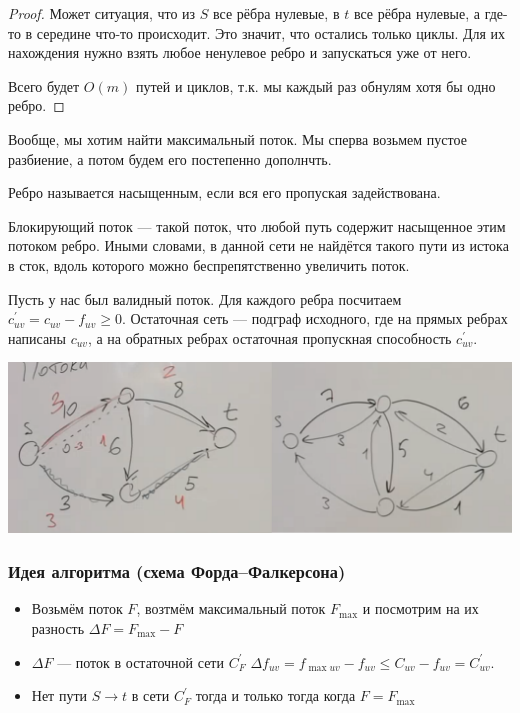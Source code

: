 \begin{proof}
    Может ситуация, что из $S$ все рёбра нулевые, в $t$ все рёбра нулевые, а где-то в середине что-то происходит. 
    Это значит, что остались только циклы. Для их нахождения нужно взять любое ненулевое ребро и запускаться уже от него.

    Всего будет $O(m)$ путей и циклов, т.к. мы каждый раз обнулям хотя бы одно ребро.
\end{proof}

Вообще, мы хотим найти максимальный поток. Мы сперва возьмем пустое разбиение, а потом будем его постепенно дополнчть.

\begin{definition}
    Ребро называется насыщенным, если вся его пропуская задействована. 
\end{definition}

\begin{definition}
    Блокирующий поток --- такой поток, что любой путь содержит насыщенное этим потоком ребро. Иными словами, в данной сети не найдётся такого пути из истока в сток, вдоль которого можно беспрепятственно увеличить поток.
\end{definition}

\begin{definition}
    Пусть у нас был валидный поток. Для каждого ребра посчитаем $c_{uv}^\prime = c_{uv} - f_{uv} \geqslant 0$. Остаточная сеть --- подграф исходного, где на прямых ребрах написаны $c_{uv}$, а на обратных ребрах остаточная пропускная способность $c_{uv}^\prime$.  
    
    \begin{center}
        \includegraphics[scale=0.37]{img/flows_rest_network.png}
    \end{center}
\end{definition}

\subsubsection*{Идея алгоритма (схема Форда--Фалкерсона)}
\begin{itemize}
    \item Возьмём поток $F$, возтмём максимальный поток $F_{\max}$ и посмотрим на их разность $\Delta F = F_{\max} - F$
    \item
    $\Delta F$ --- поток в остаточной сети $C_{F}^\prime$
    $\Delta f_{uv} = f_{\max uv} - f_{uv} \leqslant C_{uv} - f_{uv} = C_{uv}^\prime$.
    \item Нет пути $S \to t$ в сети $C_F^\prime$ тогда и только тогда когда $F = F_{\max}$
\end{itemize}

